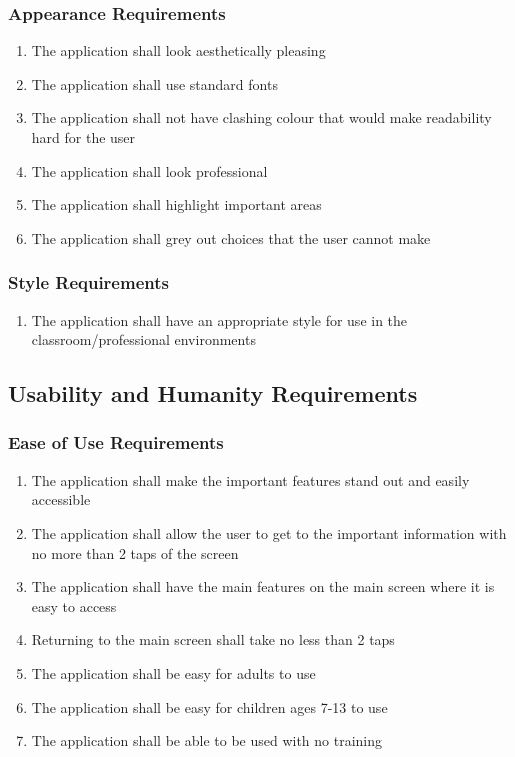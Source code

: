 \documentclass[]{article}
\begin{document}
\subsubsection{Appearance Requirements}
\label{ssub:appearance_requirements}
\begin{enumerate}[{LF}1. ]
	\item The application shall look aesthetically pleasing
	\item The application shall use standard fonts
	\item The application shall not have clashing colour that would make
readability hard for the user
	\item The application shall look professional
	\item The application shall highlight important areas
	\item The application shall grey out choices that the user cannot make

\end{enumerate}

\subsubsection{Style Requirements}
\label{ssub:style_requirements}
\begin{enumerate}[{LF}1. ]
	\item The application shall have an appropriate style for use in the
classroom/professional environments
\end{enumerate}


\subsection{Usability and Humanity Requirements}
\label{sub:usability_and_humanity_requirements}

\subsubsection{Ease of Use Requirements}
\label{ssub:ease_of_use_requirements}
\begin{enumerate}[{UH}1. ]
	\item The application shall make the important features stand out and easily
accessible
	\item The application shall allow the user to get to the important information
with no more than 2 taps of the screen
	\item The application shall have the main features on the main screen where it
is easy to access
	\item Returning to the main screen shall take no less than 2 taps
	\item The application shall be easy for adults to use
	\item The application shall be easy for children ages 7-13 to use
	\item The application shall be able to be used with no training
\end{enumerate}
\end{document}
